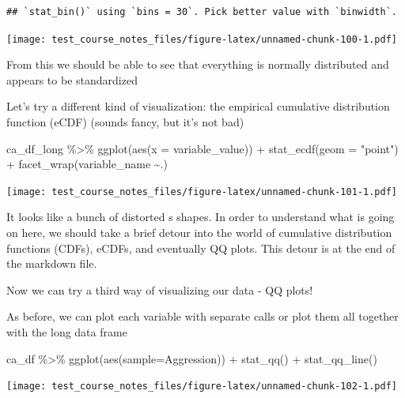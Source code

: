 \documentclass[
]{book}
\newenvironment{Shaded}{\begin{snugshade}}{\end{snugshade}}
\newcommand{\AttributeTok}[1]{\textcolor[rgb]{0.77,0.63,0.00}{#1}}
\newcommand{\FunctionTok}[1]{\textcolor[rgb]{0.00,0.00,0.00}{#1}}
\newcommand{\NormalTok}[1]{#1}
\newcommand{\SpecialCharTok}[1]{\textcolor[rgb]{0.00,0.00,0.00}{#1}}
\newcommand{\StringTok}[1]{\textcolor[rgb]{0.31,0.60,0.02}{#1}}
\begin{document}
\begin{verbatim}
## `stat_bin()` using `bins = 30`. Pick better value with `binwidth`.
\end{verbatim}

\texttt{[image: test\_course\_notes\_files/figure-latex/unnamed-chunk-100-1.pdf]}

From this we should be able to see that everything is normally distributed and appears to be standardized

Let's try a different kind of visualization: the empirical cumulative distribution function (eCDF) (sounds fancy, but it's not bad)

\begin{Shaded}
\begin{Highlighting}[]
\NormalTok{ca\_df\_long }\SpecialCharTok{\%\textgreater{}\%} 
  \FunctionTok{ggplot}\NormalTok{(}\FunctionTok{aes}\NormalTok{(}\AttributeTok{x =}\NormalTok{ variable\_value)) }\SpecialCharTok{+}
  \FunctionTok{stat\_ecdf}\NormalTok{(}\AttributeTok{geom =} \StringTok{"point"}\NormalTok{) }\SpecialCharTok{+}
  \FunctionTok{facet\_wrap}\NormalTok{(variable\_name }\SpecialCharTok{\textasciitilde{}}\NormalTok{.) }
\end{Highlighting}
\end{Shaded}

\texttt{[image: test\_course\_notes\_files/figure-latex/unnamed-chunk-101-1.pdf]}

It looks like a bunch of distorted s shapes. In order to understand what is going on here, we should take a brief detour into the world of cumulative distribution functions (CDFs), eCDFs, and eventually QQ plots. This detour is at the end of the markdown file.

Now we can try a third way of visualizing our data - QQ plots!

As before, we can plot each variable with separate calls or plot them all together with the long data frame

\begin{Shaded}
\begin{Highlighting}[]
\NormalTok{ca\_df }\SpecialCharTok{\%\textgreater{}\%} 
  \FunctionTok{ggplot}\NormalTok{(}\FunctionTok{aes}\NormalTok{(}\AttributeTok{sample=}\NormalTok{Aggression)) }\SpecialCharTok{+}
  \FunctionTok{stat\_qq}\NormalTok{() }\SpecialCharTok{+}
  \FunctionTok{stat\_qq\_line}\NormalTok{()}
\end{Highlighting}
\end{Shaded}

\texttt{[image: test\_course\_notes\_files/figure-latex/unnamed-chunk-102-1.pdf]}
\end{document}
